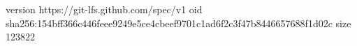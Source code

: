version https://git-lfs.github.com/spec/v1
oid sha256:154bff366c446feee9249e5ce4cbeef9701c1ad6f2c3f47b8446657688f1d02c
size 123822
